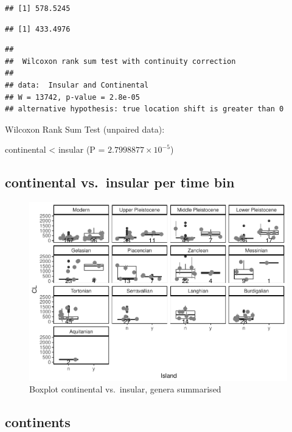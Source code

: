 \documentclass[]{article}
\begin{document}
\begin{verbatim}
## [1] 578.5245
\end{verbatim}

\begin{verbatim}
## [1] 433.4976
\end{verbatim}

\begin{verbatim}
## 
##  Wilcoxon rank sum test with continuity correction
## 
## data:  Insular and Continental
## W = 13742, p-value = 2.8e-05
## alternative hypothesis: true location shift is greater than 0
\end{verbatim}

Wilcoxon Rank Sum Test (unpaired data):

continental \textless{} insular (P = \(2.7998877\times 10^{-5}\))

\newpage

\subsection{continental vs.~insular per time
bin}\label{continental-vs.insular-per-time-bin-1}

\begin{figure}[htbp]
\centering
\includegraphics{MA_JJ_files/figure-latex/Boxplot continental vs. insular, split into time bins-1.pdf}
\caption{Boxplot continental vs.~insular, genera summarised}
\end{figure}

\newpage

\subsection{continents}\label{continents-1}
\end{document}
